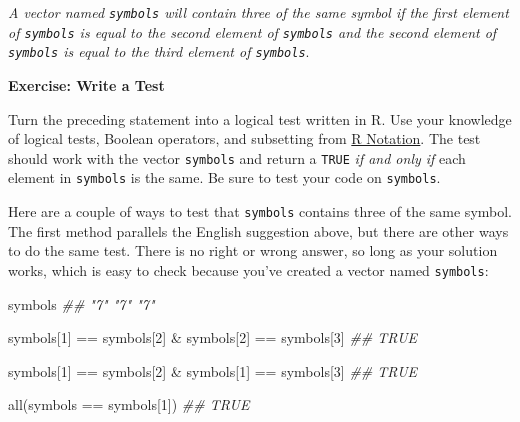 \documentclass[
  letterpaper,
  DIV=11,
  numbers=noendperiod]{scrbook}
\newenvironment{Shaded}{\begin{snugshade}}{\end{snugshade}}
\newcommand{\DecValTok}[1]{\textcolor[rgb]{0.68,0.00,0.00}{#1}}
\newcommand{\DocumentationTok}[1]{\textcolor[rgb]{0.37,0.37,0.37}{\textit{#1}}}
\newcommand{\FunctionTok}[1]{\textcolor[rgb]{0.28,0.35,0.67}{#1}}
\newcommand{\NormalTok}[1]{\textcolor[rgb]{0.00,0.23,0.31}{#1}}
\newcommand{\SpecialCharTok}[1]{\textcolor[rgb]{0.37,0.37,0.37}{#1}}
\begin{document}
\emph{A vector named \texttt{symbols} will contain three of the same
symbol if the first element of \texttt{symbols} is equal to the second
element of \texttt{symbols} and the second element of \texttt{symbols}
is equal to the third element of \texttt{symbols}}.

\begin{tcolorbox}[enhanced jigsaw, left=2mm, breakable, colback=white, colframe=quarto-callout-color-frame, leftrule=.75mm, bottomrule=.15mm, arc=.35mm, opacityback=0, rightrule=.15mm, toprule=.15mm]

\vspace{-3mm}\textbf{Exercise: Write a Test}\vspace{3mm}

Turn the preceding statement into a logical test written in R. Use your
knowledge of logical tests, Boolean operators, and subsetting from
\hyperref[sec-r-notation]{R Notation}. The test should work with the
vector \texttt{symbols} and return a \texttt{TRUE} \emph{if and only if}
each element in \texttt{symbols} is the same. Be sure to test your code
on \texttt{symbols}.

\end{tcolorbox}

Here are a couple of ways to test that \texttt{symbols} contains three
of the same symbol. The first method parallels the English suggestion
above, but there are other ways to do the same test. There is no right
or wrong answer, so long as your solution works, which is easy to check
because you've created a vector named \texttt{symbols}:

\begin{Shaded}
\begin{Highlighting}[]
\NormalTok{symbols}
\DocumentationTok{\#\#  "7" "7" "7"}

\NormalTok{symbols[}\DecValTok{1}\NormalTok{] }\SpecialCharTok{==}\NormalTok{ symbols[}\DecValTok{2}\NormalTok{] }\SpecialCharTok{\&}\NormalTok{ symbols[}\DecValTok{2}\NormalTok{] }\SpecialCharTok{==}\NormalTok{ symbols[}\DecValTok{3}\NormalTok{]}
\DocumentationTok{\#\# TRUE}

\NormalTok{symbols[}\DecValTok{1}\NormalTok{] }\SpecialCharTok{==}\NormalTok{ symbols[}\DecValTok{2}\NormalTok{] }\SpecialCharTok{\&}\NormalTok{ symbols[}\DecValTok{1}\NormalTok{] }\SpecialCharTok{==}\NormalTok{ symbols[}\DecValTok{3}\NormalTok{]}
\DocumentationTok{\#\# TRUE}

\FunctionTok{all}\NormalTok{(symbols }\SpecialCharTok{==}\NormalTok{ symbols[}\DecValTok{1}\NormalTok{])}
\DocumentationTok{\#\# TRUE}
\end{Highlighting}
\end{Shaded}
\end{document}
